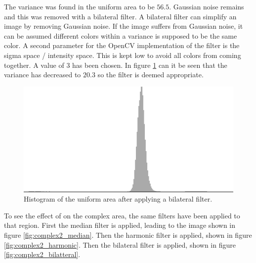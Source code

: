 The variance was found in the uniform area to be $56.5$.
Gaussian noise remains and this was removed with a bilateral filter.
A bilateral filter can simplify an image by removing Gaussian noise.
If the image suffers from Gaussian noise, it can be assumed different colors within a variance is supposed to be the same color.
A second parameter for the OpenCV implementation of the filter is the sigma space / intensity space. 
This is kept low to avoid all colors from coming together. 
A value of 3 has been chosen.
In figure \ref{fig:hist2_bilateral} can it be seen that the variance has decreased to $20.3$ so the filter is deemed appropriate.

\begin{figure}[H]
\centering
\includegraphics[width = \histogramWidth]{graphics/hist2_after_bilatteral.png}
\caption{Histogram of the uniform area after applying a bilateral filter.}
\label{fig:hist2_bilateral}
\end{figure}

To see the effect of on the complex area, the same filters have been applied to that region.
First the median filter is applied, leading to the image shown in figure \ref{fig:complex2_median}.
Then the harmonic filter is applied, shown in figure \ref{fig:complex2_harmonic}.
Then the bilateral filter is applied, shown in figure \ref{fig:complex2_bilatteral}.

